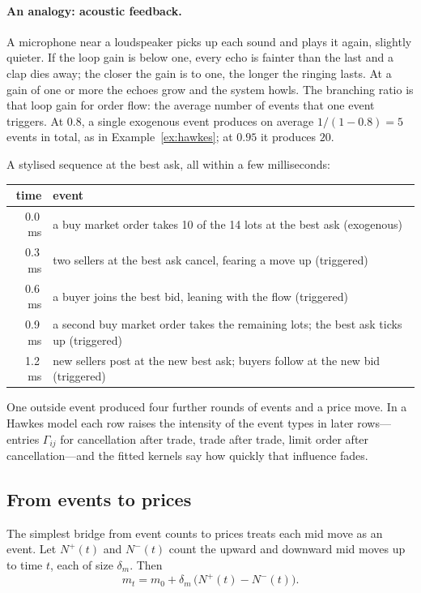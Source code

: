 \paragraph{An analogy: acoustic feedback.} A microphone near a loudspeaker picks up each sound and
plays it again, slightly quieter. If the loop gain is below one, every echo is fainter than the last
and a clap dies away; the closer the gain is to one, the longer the ringing lasts. At a gain of one or
more the echoes grow and the system howls. The branching ratio is that loop gain for order flow: the
average number of events that one event triggers. At $0.8$, a single exogenous event produces on average
$1/(1-0.8) = 5$ events in total, as in Example~\ref{ex:hawkes}; at $0.95$ it produces $20$.

\begin{example}
\label{ex:chain}
A stylised sequence at the best ask, all within a few milliseconds:
\begin{center}\small
\begin{tabular}{rl}
\toprule
time & event \\
\midrule
0.0\,ms & a buy market order takes 10 of the 14 lots at the best ask (exogenous) \\
0.3\,ms & two sellers at the best ask cancel, fearing a move up (triggered) \\
0.6\,ms & a buyer joins the best bid, leaning with the flow (triggered) \\
0.9\,ms & a second buy market order takes the remaining lots; the best ask ticks up (triggered) \\
1.2\,ms & new sellers post at the new best ask; buyers follow at the new bid (triggered) \\
\bottomrule
\end{tabular}
\end{center}
One outside event produced four further rounds of events and a price move. In a Hawkes model each row raises the intensity
of the event types in later rows---entries $\Gamma_{ij}$ for cancellation after trade, trade after
trade, limit order after cancellation---and the fitted kernels say how quickly that influence fades.
\end{example}

\subsection{From events to prices}
\label{sec:hawkes-prices}

The simplest bridge from event counts to prices treats each mid move as an event. Let $N^{+}(t)$
and $N^{-}(t)$ count the upward and downward mid moves up to time $t$, each of size $\delta_m$. Then
\begin{equation}
  m_t = m_0 + \delta_m\,\big(N^{+}(t) - N^{-}(t)\big).
\end{equation}

